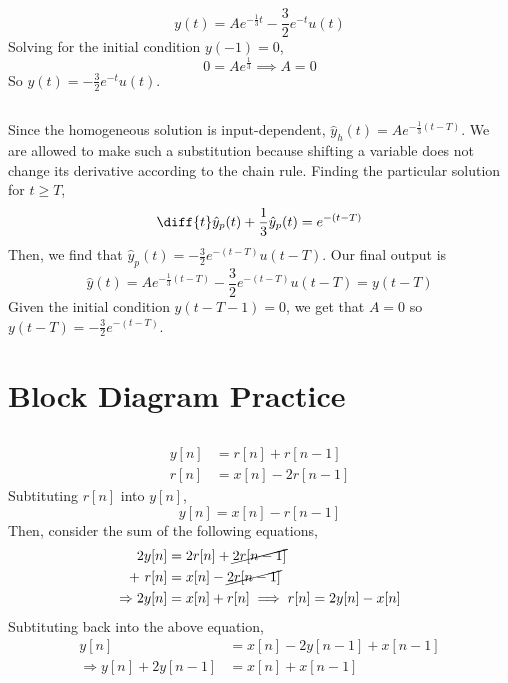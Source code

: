 \documentclass{article}
\begin{document}
\subsection{}

\begin{equation}
    y(t) = A e^{-\frac{1}{3}t} - \frac{3}{2} e^{-t} u(t)
\end{equation}
Solving for the initial condition \(y(-1) = 0\),
\begin{equation}
    0 = A e^{\frac{1}{3}} \implies A = 0
\end{equation}
So \(y(t) = -\frac{3}{2} e^{-t} u(t)\).

\subsection{}

Since the homogeneous solution is input-dependent, \(\hat{y}_h(t) = A e^{-\frac{1}{3} (t - T)}\).
We are allowed to make such a substitution because shifting a variable does not change its derivative according to the chain rule.
Finding the particular solution for \(t \geqslant T\),
\begin{equation}
    \diff{t} \hat{y}_p(t) + \frac{1}{3} \hat{y}_p(t) = e^{-(t - T)}
\end{equation}
Then, we find that \(\hat{y}_p(t) = -\frac{3}{2} e^{-(t - T)} u(t - T)\).
Our final output is
\begin{equation}
    \hat{y}(t) = A e^{-\frac{1}{3}(t - T)} - \frac{3}{2} e^{-(t - T)} u(t - T) = y(t - T)
\end{equation}
Given the initial condition \(y(t - T - 1) = 0\), we get that \(A = 0\) so \(y(t - T) = -\frac{3}{2} e^{-(t - T)}\).

\section{Block Diagram Practice}

\subsection{}

\begin{align}
    y[n] &= r[n] + r[n - 1] \\
    r[n] &= x[n] - 2r[n - 1]
\end{align}
Subtituting \(r[n]\) into \(y[n]\),
\begin{equation}
    y[n] = x[n] - r[n - 1]
\end{equation}
Then, consider the sum of the following equations,
\begin{align}
    2y[n] &= 2r[n] + \cancel{2r[n - 1]} \\
    + \ r[n] &= x[n] - \cancel{2r[n - 1]} \\
    \Rightarrow 2y[n] &= x[n] + r[n] \implies r[n] = 2y[n] - x[n]
\end{align}
Subtituting back into the above equation,
\begin{align}
    y[n] &= x[n] - 2y[n - 1] + x[n - 1] \\
    \Rightarrow y[n] + 2y[n - 1] &= x[n] + x[n - 1]
\end{align}
\end{document}
